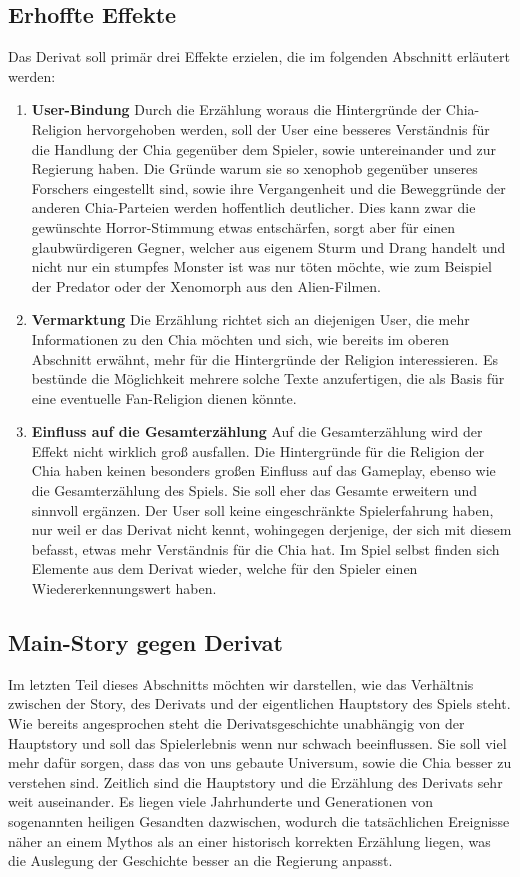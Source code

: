 \documentclass[12pt]{article}
\begin{document}
 	\subsection{Erhoffte Effekte}
 		Das Derivat soll primär drei Effekte erzielen, die im folgenden Abschnitt erläutert werden:
 	\begin{enumerate}
	\item{\textbf{User-Bindung}}\newline
	 	Durch die Erzählung woraus die Hintergründe der Chia-Religion hervorgehoben werden, soll der User eine besseres Verständnis für die Handlung der Chia gegenüber dem Spieler, sowie untereinander und zur Regierung haben. Die Gründe warum sie so xenophob gegenüber unseres Forschers eingestellt sind, sowie ihre Vergangenheit und die Beweggründe der anderen Chia-Parteien werden hoffentlich deutlicher. Dies kann zwar die gewünschte Horror-Stimmung etwas entschärfen, sorgt aber für einen glaubwürdigeren Gegner, welcher aus eigenem Sturm und Drang handelt und nicht nur ein stumpfes Monster ist was nur töten möchte, wie zum Beispiel der Predator oder der Xenomorph aus den Alien-Filmen.
	 \item{\textbf{Vermarktung}}\newline
	 	Die Erzählung richtet sich an diejenigen User, die mehr Informationen zu den Chia möchten und sich, wie bereits im oberen Abschnitt erwähnt, mehr für die Hintergründe der Religion interessieren. Es bestünde die Möglichkeit mehrere solche Texte anzufertigen, die als Basis für eine eventuelle Fan-Religion dienen könnte.
	 	\item{\textbf{Einfluss auf die Gesamterzählung}}\newline
	 	Auf die Gesamterzählung wird der Effekt nicht wirklich groß ausfallen. Die Hintergründe für die Religion der Chia haben keinen besonders großen Einfluss auf das Gameplay, ebenso wie die Gesamterzählung des Spiels. Sie soll eher das Gesamte erweitern und sinnvoll ergänzen. Der User soll keine eingeschränkte Spielerfahrung haben, nur weil er das Derivat nicht kennt, wohingegen derjenige, der sich mit diesem befasst, etwas mehr Verständnis für die Chia hat. Im Spiel selbst finden sich Elemente aus dem Derivat wieder, welche für den Spieler einen Wiedererkennungswert haben.     
 	\end{enumerate}
 	\subsection{Main-Story gegen Derivat}
	 Im letzten Teil dieses Abschnitts möchten wir darstellen, wie das Verhältnis zwischen der Story, des Derivats und der eigentlichen Hauptstory des Spiels steht. Wie bereits angesprochen steht die Derivatsgeschichte unabhängig von der Hauptstory und soll das Spielerlebnis wenn nur schwach beeinflussen. Sie soll viel mehr dafür sorgen, dass das von uns gebaute Universum, sowie die Chia besser zu verstehen sind. Zeitlich sind die Hauptstory und die Erzählung des Derivats sehr weit auseinander. Es liegen viele Jahrhunderte und Generationen von sogenannten heiligen Gesandten dazwischen, wodurch die tatsächlichen Ereignisse näher an einem Mythos als an einer historisch korrekten Erzählung liegen, was die Auslegung der Geschichte besser an die Regierung anpasst.  	
			
\end{document}
